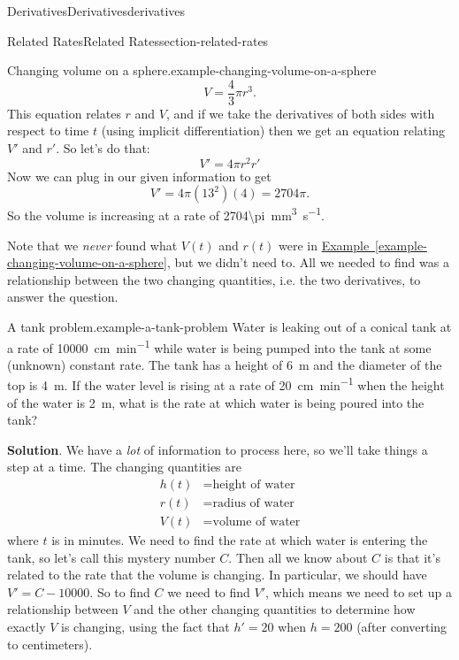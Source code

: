 \documentclass[oneside,10pt,]{book}
\numberwithin{equation}{section}
\begin{document}
\begin{chapterptx}{Derivatives}{}{Derivatives}{}{}{derivatives}
\begin{sectionptx}{Related Rates}{}{Related Rates}{}{}{section-related-rates}
\begin{example}{Changing volume on a sphere.}{example-changing-volume-on-a-sphere}
\begin{equation*}
V = \frac{4}{3}\pi r^{3}.
\end{equation*}
This equation relates \(r\) and \(V\), and if we take the derivatives of both sides with respect to time \(t\) (using implicit differentiation) then we get an equation relating \(V'\) and \(r'\). So let's do that:%
\begin{equation*}
V' = 4\pi r^{2}r'
\end{equation*}
Now we can plug in our given information to get%
\begin{equation*}
V' = 4\pi(13^{2})(4) = 2704\pi.
\end{equation*}
So the volume is increasing at a rate of \SI{2704\pi}{\milli\meter\tothe{3}\per\second}.%
\end{example}
\hypertarget{p-171}{}%
Note that we \emph{never} found what \(V(t)\) and \(r(t)\) were in \hyperref[example-changing-volume-on-a-sphere]{Example~\ref{example-changing-volume-on-a-sphere}}, but we didn't need to. All we needed to find was a relationship between the two changing quantities, i.e. the two derivatives, to answer the question.%
\begin{example}{A tank problem.}{example-a-tank-problem}%
\hypertarget{p-172}{}%
Water is leaking out of a conical tank at a rate of \SI{10000}{\centi\meter\per\minute} while water is being pumped into the tank at some (unknown) constant rate. The tank has a height of \SI{6}{\meter} and the diameter of the top is \SI{4}{\meter}. If the water level is rising at a rate of \SI{20}{\centi\meter\per\minute} when the height of the water is \SI{2}{\meter}, what is the rate at which water is being poured into the tank?%
\par\smallskip%
\noindent\textbf{Solution}.\hypertarget{solution-38}{}\quad%
\hypertarget{p-173}{}%
We have a \emph{lot} of information to process here, so we'll take things a step at a time. The changing quantities are%
\begin{align*}
h(t) & = \text{height of water} \\
r(t) & = \text{radius of water} \\
V(t) & = \text{volume of water} 
\end{align*}
where \(t\) is in minutes. We need to find the rate at which water is entering the tank, so let's call this mystery number \(C\). Then all we know about \(C\) is that it's related to the rate that the volume is changing. In particular, we should have \(V' = C - 10000\). So to find \(C\) we need to find \(V'\), which means we need to set up a relationship between \(V\) and the other changing quantities to determine how exactly \(V\) is changing, using the fact that \(h' = 20\) when \(h=200\) (after converting to centimeters).%

\end{example}
\end{sectionptx}
\end{chapterptx}
\end{document}
